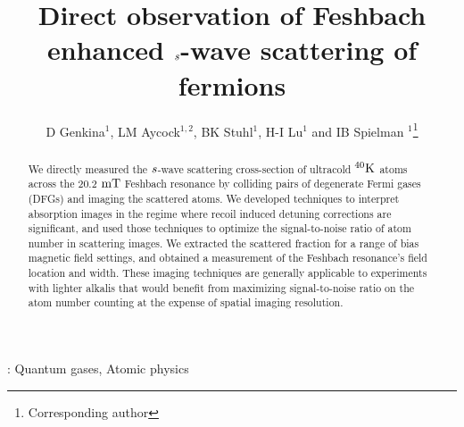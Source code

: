 \documentclass[12pt]{iopart}
\begin{document}
\newcommand{\swave}[0]{$\it{s}$-wave}
\newcommand{\pwave}[0]{$\it{p}$-wave}
\newcommand{\K}{$^{40}\rm{K}$}
\newcommand{\Rb}{$^{87}\rm{Rb}$}
\newcommand{\us}{$\rm{\mu s}$}
\newcommand{\mT}{$\rm{mT}$}
\newcommand{\ez}{$\bi{e_z}$}
\newcommand{\ex}{$\bi{e_x}$}
\newcommand{\um}{$\rm{\mu m}$}
\renewcommand{\thefootnote}{\arabic{footnote}}



\title[]{Direct observation of Feshbach enhanced \swave{} scattering of fermions}

\author{D Genkina$^1$, LM Aycock$^{1,2}$, BK Stuhl$^1$, H-I Lu$^1$ and IB Spielman
$^1$\footnote{Corresponding author}}

\address{$^1$Joint Quantum Institute, National Institute of Standards and Technology, and University of Maryland, Gaithersburg, MD, 20899 USA}
\address{$^2$Physics Department, Cornell University, Ithaca, NY 14850 USA}


\begin{abstract}
We directly measured the \swave{} scattering cross-section of ultracold \K{} atoms across the 20.2 \mT{} Feshbach resonance by colliding pairs of degenerate Fermi gases (DFGs) and imaging the scattered atoms.  We developed techniques to interpret absorption images in the regime where recoil induced detuning corrections are significant, and used those techniques to optimize the signal-to-noise ratio of atom number in scattering images. We extracted the scattered fraction for a range of bias magnetic field settings, and obtained a measurement of the Feshbach resonance's field location and width. These imaging techniques are generally applicable to experiments with lighter alkalis that would benefit from maximizing signal-to-noise ratio on the atom number counting at the expense of spatial imaging resolution.
\end{abstract}

\vspace{2pc}
: Quantum gases, Atomic physics

\maketitle
\end{document}

